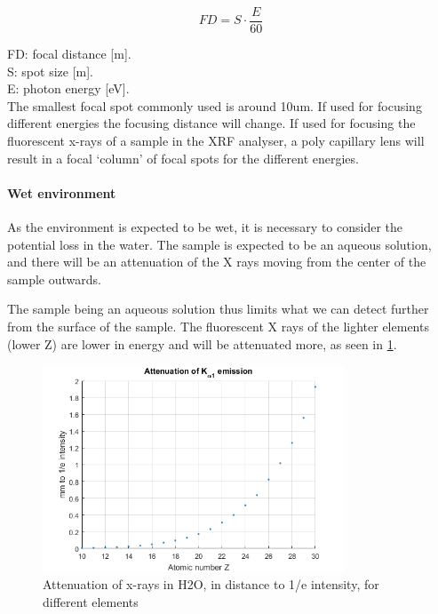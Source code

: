 \begin{equation}
FD = S \cdot \frac{E}{60}
\end{equation}

\noindent FD: focal distance [m].\\
S: spot size [m].\\
E: photon energy [eV].\\

The smallest focal spot commonly used is around 10um.
If used for focusing different energies the focusing distance will change. If used for focusing the fluorescent x-rays of a sample in the XRF analyser, a poly capillary lens will result in a focal ‘column’ of focal spots for the different energies. 


\paragraph{Wet environment}
As the environment is expected to be wet, it is necessary to consider the potential loss in the water. The sample is expected to be an aqueous solution, and there will be an attenuation of the X rays moving from the center of the sample outwards. 

The sample being an aqueous solution thus limits what we can detect further from the surface of the sample. The fluorescent X rays of the lighter elements (lower Z)  are lower in energy and will be attenuated more, as seen in \ref{fig:AttnH2O}.

\begin{figure}[htb]
	\centering
	\includegraphics[width=0.8\textwidth]{figures/XRF/AttnOfKaplha.png}
	\caption{Attenuation of x-rays in H2O, in distance to 1/e intensity, for different elements\citep{XRay_Attn_H2O}}
	\label{fig:AttnH2O}
\end{figure}

